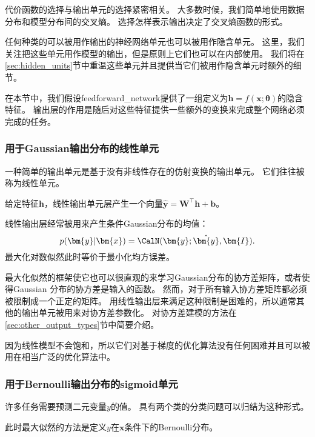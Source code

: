 代价函数的选择与输出单元的选择紧密相关。
大多数时候，我们简单地使用数据分布和模型分布间的交叉熵。
选择怎样表示输出决定了交叉熵函数的形式。

任何种类的可以被用作输出的神经网络单元也可以被用作隐含单元。
这里，我们关注把这些单元用作模型的输出，但是原则上它们也可以在内部使用。
我们将在\ref{sec:hidden_units}节中重温这些单元并且提供当它们被用作隐含单元时额外的细节。

在本节中，我们假设\gls{feedforward_network}提供了一组定义为$\bm{h}=f(\bm{x};\bm{\theta})$的隐含特征。
输出层的作用是随后对这些特征提供一些额外的变换来完成整个网络必须完成的任务。


\subsubsection{用于Gaussian输出分布的线性单元}
\label{sec:linear_units_for_gaussian_output_distributions}

一种简单的输出单元是基于没有非线性存在的仿射变换的输出单元。
它们往往被称为线性单元。

给定特征$\bm{h}$，线性输出单元层产生一个向量$\hat{\bm{y}} = \bm{W}^\top \bm{h}+\bm{b}$。

线性输出层经常被用来产生条件Gaussian分布的均值：
\begin{equation}
p(\bm{y}|\bm{x}) = \CalN(\bm{y}; \hat{\bm{y}}, \bm{I} ).
\end{equation}
最大化对数似然此时等价于最小化均方误差。

最大化似然的框架使它也可以很直观的来学习Gaussian分布的协方差矩阵，或者使得Gaussian 分布的协方差是输入的函数。
然而，对于所有输入协方差矩阵都必须被限制成一个正定的矩阵。
用线性输出层来满足这种限制是困难的，所以通常其他的输出单元被用来对协方差参数化。
对协方差建模的方法在\ref{sec:other_output_types}节中简要介绍。

因为线性模型不会饱和，所以它们对基于梯度的优化算法没有任何困难并且可以被用在相当广泛的优化算法中。

\subsubsection{用于Bernoulli输出分布的sigmoid单元}
\label{sec:sigmoid_units_for_bernoulli_output_distributions}

许多任务需要预测二元变量$y$的值。
具有两个类的分类问题可以归结为这种形式。

此时最大似然的方法是定义$y$在$\bm{x}$条件下的Bernoulli分布。

